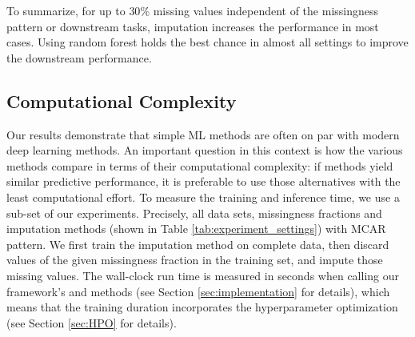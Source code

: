 To summarize, for up to $30\%$ missing values independent of the missingness pattern or downstream tasks, imputation increases the performance in most cases. Using random forest holds the best chance in almost all settings to improve the downstream performance.

\subsection{Computational Complexity}
%
Our results demonstrate that simple ML methods are often on par with modern deep learning methods. An important question in this context is how the various methods compare in terms of their computational complexity: if methods yield similar predictive performance, it is preferable to use those alternatives with the least computational effort. To measure the training and inference time, we use a sub-set of our experiments. Precisely, all data sets, missingness fractions and imputation methods (shown in Table \ref{tab:experiment_settings}) with MCAR pattern. We first train the imputation method on complete data, then discard values of the given missingness fraction in the training set, and impute those missing values. The wall-clock run time is measured in seconds when calling our framework's  and  methods (see Section \ref{sec:implementation} for details), which means that the training duration incorporates the hyperparameter optimization (see Section \ref{sec:HPO} for details).

